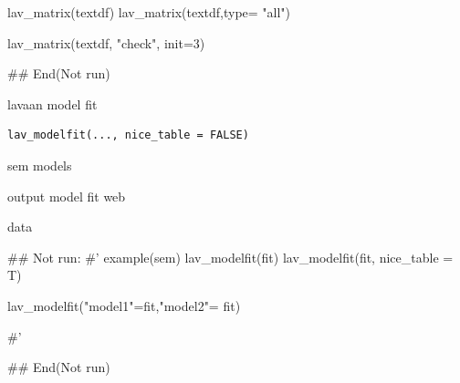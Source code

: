 \documentclass[a4paper]{book}
\begin{document}
\begin{Examples}
\begin{ExampleCode}
lav_matrix(textdf)
lav_matrix(textdf,type= "all")

lav_matrix(textdf, "check", init=3)



## End(Not run)

\end{ExampleCode}
\end{Examples}

%
\begin{Description}
lavaan model fit
\end{Description}
%
\begin{Usage}
\begin{verbatim}
lav_modelfit(..., nice_table = FALSE)
\end{verbatim}
\end{Usage}
%
\begin{Arguments}
\begin{ldescription}
\item[\code{...}] sem models

\item[\code{nice\_table}] output model fit web
\end{ldescription}
\end{Arguments}
%
\begin{Value}
data
\end{Value}
%
\begin{Examples}
\begin{ExampleCode}

\#\# Not run: 
#'
example(sem)
lav_modelfit(fit)
lav_modelfit(fit, nice_table = T)

lav_modelfit("model1"=fit,"model2"= fit)

#'

## End(Not run)


\end{ExampleCode}
\end{Examples}
\end{document}

